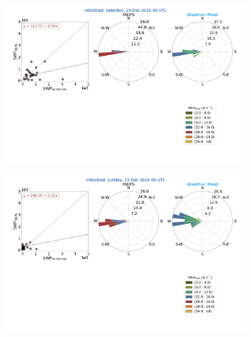 \begin{figure}\ContinuedFloat
	\centering
	\begin{subfigure}[b]{0.84\textwidth}
		\includegraphics[trim={2.3cm 19.5cm 2.cm .7cm},clip,width=\textwidth]{./fig_windrose/20161224}
		\caption{}\label{fig:wind24}
	\end{subfigure}
	\newline
	\centering
	\begin{subfigure}[b]{0.84\textwidth}
		\includegraphics[trim={2.3cm 19.5cm 2.cm .7cm},clip,width=\textwidth]{./fig_windrose/20161225}
		\caption{}\label{fig:wind25}
	\end{subfigure}

\end{figure}
